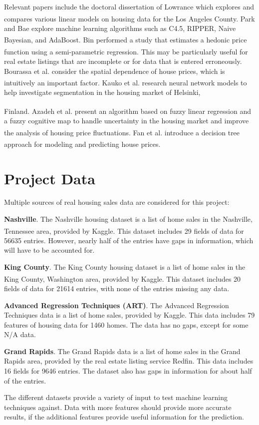 \documentclass[10pt]{article}
\begin{document}
\begin{multicols}{2}
		Relevant papers include the doctoral dissertation of Lowrance which explores and compares various linear models on housing data for the Los Angeles County.\textsuperscript{\cite{lowrance}} Park and Bae explore machine learning algorithms such as C4.5, RIPPER, Naive Bayesian, and AdaBoost.\textsuperscript{\cite{park}} Bin performed a study that estimates a hedonic price function using a semi-parametric regression.\textsuperscript{\cite{bin}} This may be particularly useful for real estate listings that are incomplete or for data that is entered erroneously. Bourassa et al. consider the spatial dependence of house prices, which is intuitively an important factor.\textsuperscript{\cite{bourassa1}\cite{bourassa2}} Kauko et al. research neural network models to help investigate segmentation in the housing market of Helsinki, 
		
		Finland.\textsuperscript{\cite{kauko}} Azadeh et al. present an algorithm based on fuzzy linear regression and a fuzzy cognitive map to handle uncertainty in the housing market and improve the analysis of housing price fluctuations.\textsuperscript{\cite{azadeh}} Fan et al. introduce a decision tree approach for modeling and predicting house prices.\textsuperscript{\cite{fan}}

		\section{Project Data}
		Multiple sources of real housing sales data are considered for this project:

		\textbf{Nashville}. The Nashville housing dataset is a list of home sales in the Nashville, Tennessee area, provided by Kaggle\textsuperscript{\cite{nashville_data}}. This dataset includes 29 fields of data for 56635 entries. However, nearly half of the entries have gaps in information, which will have to be accounted for.

		\textbf{King County}. The King County housing dataset is a list of home sales in the King County, Washington area, provided by Kaggle\textsuperscript{\cite{kc_data}}. This dataset includes 20 fields of data for 21614 entries, with none of the entries missing any data.
		\par
		\textbf{Advanced Regression Techniques (ART)}. The Advanced Regression Techniques data is a list of home sales, provided by Kaggle. This data includes 79 features of housing data for 1460 homes. The data has no gaps, except for some N/A data.
		\par
		\textbf{Grand Rapids}. The Grand Rapids data is a list of home sales in the Grand Rapids area, provided by the real estate listing service Redfin. This data includes 16 fields for 9646 entries. The dataset also has gaps in information for about half of the entries.
		\par
		The different datasets provide a variety of input to test machine learning techniques against. Data with more features should provide more accurate results, if the additional features provide useful information for the prediction.
		

\end{multicols}
\end{document}
